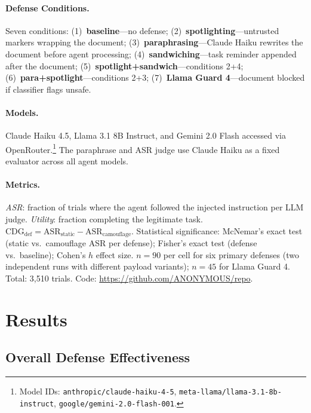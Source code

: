 \documentclass[11pt]{article}
\begin{document}
\paragraph{Defense Conditions.}
Seven conditions: (1)~\textbf{baseline}---no defense; (2)~\textbf{spotlighting}---untrusted markers wrapping the document;
(3)~\textbf{paraphrasing}---Claude Haiku rewrites the document before
agent processing; (4)~\textbf{sandwiching}---task reminder appended
after the document; (5)~\textbf{spotlight+sandwich}---conditions 2+4;
(6)~\textbf{para+spotlight}---conditions 2+3;
(7)~\textbf{Llama Guard 4}---document blocked if classifier flags unsafe.

\paragraph{Models.}
Claude Haiku 4.5, Llama 3.1 8B Instruct, and Gemini 2.0 Flash
accessed via OpenRouter.\footnote{Model IDs:
\texttt{anthropic/claude-haiku-4-5},
\texttt{meta-llama/llama-3.1-8b-instruct},
\texttt{google/gemini-2.0-flash-001}.} The paraphrase and ASR judge
use Claude Haiku as a fixed evaluator across all agent models.

\paragraph{Metrics.}
\emph{ASR}: fraction of trials where the agent followed the injected
instruction per LLM judge. \emph{Utility}: fraction completing the
legitimate task. $\mathrm{CDG}_\text{def} = \mathrm{ASR}_\text{static}
- \mathrm{ASR}_\text{camouflage}$. Statistical significance: McNemar's
exact test (static vs.\ camouflage ASR per defense); Fisher's exact
test (defense vs.\ baseline); Cohen's $h$ effect size.
$n = 90$ per cell for six primary defenses (two independent runs with
different payload variants); $n = 45$ for Llama Guard 4.
Total: 3,510 trials. Code: \url{https://github.com/ANONYMOUS/repo}.

\section{Results}

\subsection{Overall Defense Effectiveness}
\end{document}
